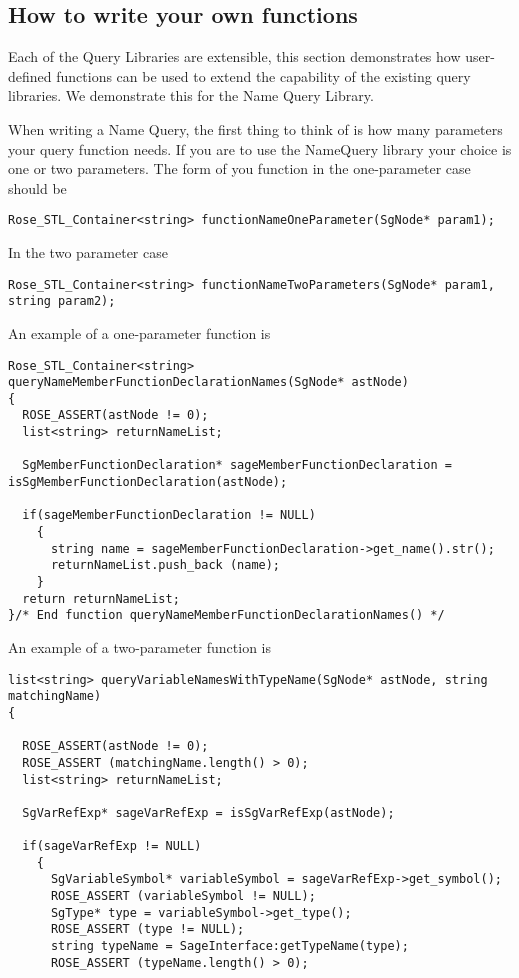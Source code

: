 {\subsection{How to write your own functions}

Each of the Query Libraries are extensible, this section demonstrates
how user-defined functions can be used to extend the capability of the
existing query libraries.  We demonstrate this for the Name Query Library.

When writing a Name Query, the first thing to think of is how many
parameters your query function needs. If you are to use the NameQuery
library your choice is one or two parameters. The form of you function
in the one-parameter case should be
\begin{verbatim}
Rose_STL_Container<string> functionNameOneParameter(SgNode* param1);
\end{verbatim}
In the two parameter case
\begin{verbatim}
Rose_STL_Container<string> functionNameTwoParameters(SgNode* param1, string param2);
\end{verbatim}
An example of a one-parameter function is
\begin{verbatim}
Rose_STL_Container<string> queryNameMemberFunctionDeclarationNames(SgNode* astNode)
{
  ROSE_ASSERT(astNode != 0);
  list<string> returnNameList;

  SgMemberFunctionDeclaration* sageMemberFunctionDeclaration = isSgMemberFunctionDeclaration(astNode);

  if(sageMemberFunctionDeclaration != NULL)
    {
      string name = sageMemberFunctionDeclaration->get_name().str();
      returnNameList.push_back (name);
    }
  return returnNameList;
}/* End function queryNameMemberFunctionDeclarationNames() */

\end{verbatim}
An example of a two-parameter function is
\begin{verbatim}
list<string> queryVariableNamesWithTypeName(SgNode* astNode, string matchingName)
{

  ROSE_ASSERT(astNode != 0);
  ROSE_ASSERT (matchingName.length() > 0);
  list<string> returnNameList;

  SgVarRefExp* sageVarRefExp = isSgVarRefExp(astNode);

  if(sageVarRefExp != NULL)
    {
      SgVariableSymbol* variableSymbol = sageVarRefExp->get_symbol();
      ROSE_ASSERT (variableSymbol != NULL);
      SgType* type = variableSymbol->get_type();
      ROSE_ASSERT (type != NULL);
      string typeName = SageInterface:getTypeName(type);
      ROSE_ASSERT (typeName.length() > 0);


\end{verbatim}}
